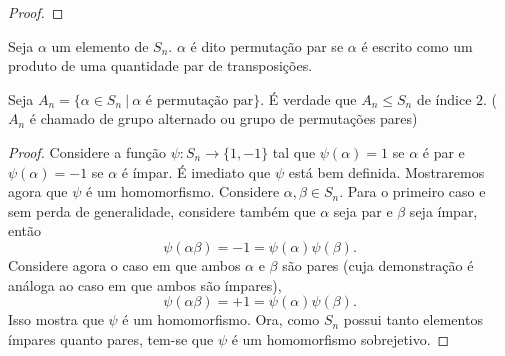 \documentclass[11pt,openany]{book}
\newenvironment{novo}{
    \color{red}
}{}
\begin{document}
\begin{novo}
\begin{proof}
\end{proof}

\begin{definition}
\label{def:permutacao_par}
    Seja $\alpha$ um elemento de $S_n$. $\alpha$ é dito permutação par se $\alpha$ é escrito como um produto de uma quantidade par de transposições.
\end{definition}
\begin{proposition}
\label{prop:}
    Seja $A_n = \{\alpha \in S_n \ | \ \text{$\alpha$ é permutação par}\}.$ É verdade que $A_n \leq S_n$ de índice $2$. ($A_n$ é chamado de grupo alternado ou grupo de permutações pares)
\end{proposition}

\begin{proof}
    Considere a função $\psi: S_n \rightarrow \{1, -1\}$ tal que $\psi(\alpha) = 1$ se $\alpha$ é par e $\psi(\alpha) = -1$ se $\alpha$ é ímpar. É imediato que $\psi$ está bem definida. Mostraremos agora que $\psi$ é um homomorfismo. Considere $\alpha, \beta \in S_n$. Para o primeiro caso e sem perda de generalidade, considere também que $\alpha$ seja par e $\beta$ seja ímpar, então
    \[\psi(\alpha \beta) =  -1 = \psi(\alpha) \psi(\beta).\]
    Considere agora o caso em que ambos $\alpha$ e $\beta$ são pares (cuja demonstração é análoga ao caso em que ambos são ímpares),
    \[\psi(\alpha \beta) = +1 = \psi(\alpha) \psi(\beta).\]
    Isso mostra que $\psi$ é um homomorfismo.
    Ora, como $S_n$ possui tanto elementos ímpares quanto pares, tem-se que $\psi$ é um homomorfismo sobrejetivo.
\end{proof}
\end{novo}
\end{document}
